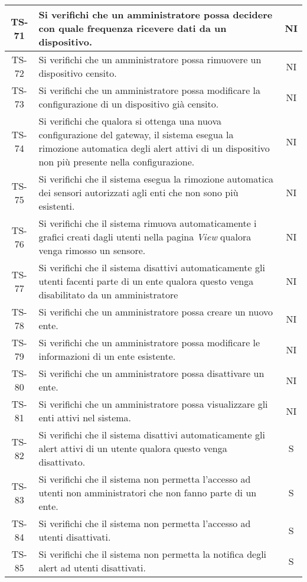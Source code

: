 \begin{center}
\begin{longtable}{|c|p{10cm}|c|}
			 \hline
			 TS-71 & Si verifichi che un amministratore possa decidere con quale frequenza ricevere dati da un dispositivo. & NI \\
			 \hline
			 TS-72 & Si verifichi che un amministratore possa rimuovere un dispositivo censito. & NI \\
			 \hline
			 TS-73 & Si verifichi che un amministratore possa modificare la configurazione di un dispositivo già censito. & NI \\
			 \hline
			 TS-74 & Si verifichi che qualora si ottenga una nuova configurazione del gateway, il sistema esegua la rimozione automatica degli alert attivi di un dispositivo non più presente nella configurazione. & NI \\
			 \hline
			 TS-75 & Si verifichi che il sistema esegua la rimozione automatica dei sensori autorizzati agli enti che non sono più esistenti. & NI \\
			 \hline
			 TS-76 & Si verifichi che il sistema rimuova automaticamente i grafici creati dagli utenti nella pagina \textit{View} qualora venga rimosso un sensore. & NI \\
			 \hline
			 TS-77 & Si verifichi che il sistema disattivi automaticamente gli utenti facenti parte di un ente qualora questo venga disabilitato da un amministratore & NI \\
			 \hline
			 TS-78 & Si verifichi che un amministratore possa creare un nuovo ente. & NI \\
			 \hline
			 TS-79 & Si verifichi che un amministratore possa modificare le informazioni di un ente esistente. & NI \\
			 \hline
			 TS-80 & Si verifichi che un amministratore possa disattivare un ente. & NI \\
			 \hline
			 TS-81 & Si verifichi che un amministratore possa visualizzare gli enti attivi nel sistema. & NI \\
			 \hline
			 TS-82 & Si verifichi che il sistema disattivi automaticamente gli alert attivi di un utente qualora questo venga disattivato. & S \\
			 \hline
			 TS-83 & Si verifichi che il sistema non permetta l'accesso ad utenti non amministratori che non fanno parte di un ente. & S \\
			 \hline
			 TS-84 & Si verifichi che il sistema non permetta l'accesso ad utenti disattivati. & S \\
			 \hline
			 TS-85 & Si verifichi che il sistema non permetta la notifica degli alert ad utenti disattivati. & S \\

\end{longtable}
\end{center}
